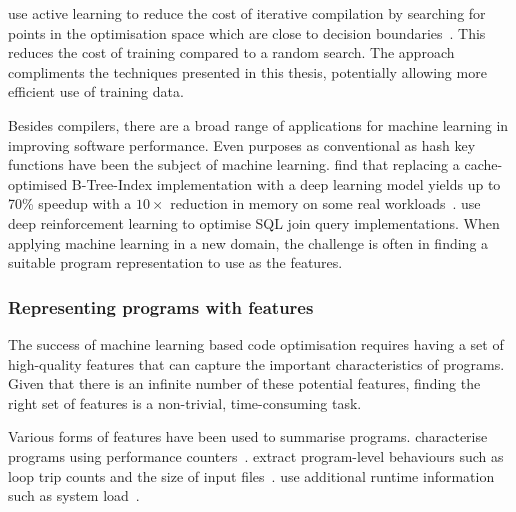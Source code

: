 \citeauthor{Ogilvie2017} use active learning to reduce the cost of iterative compilation by searching for points in the optimisation space which are close to decision boundaries~\cite{Ogilvie2017}. This reduces the cost of training compared to a random search. The approach compliments the techniques presented in this thesis, potentially allowing more efficient use of training data.

Besides compilers, there are a broad range of applications for machine learning in improving software performance.
Even purposes as conventional as hash key functions have been the subject of machine learning. \citeauthor{Kraska2017} find that replacing a cache-optimised B-Tree-Index implementation with a deep learning model yields up to 70\% speedup with a $10\times$ reduction in memory on some real workloads~\cite{Kraska2017}.
\citeauthor{Krishnan2018} use deep reinforcement learning to optimise SQL join query implementations. %
When applying machine learning in a new domain, the challenge is often in finding a suitable program representation to use as the features.


\subsubsection{Representing programs with features}

The success of machine learning based code optimisation requires having a set of high-quality features that can capture the important characteristics of programs. Given that there is an infinite number of these potential features, finding the right set of features is a non-trivial, time-consuming task.

Various forms of features have been used to summarise programs.
\citeauthor{Dubach2009} characterise programs using performance counters~\cite{Dubach2009}.
\citeauthor{Jiang2010} extract program-level behaviours such as loop trip counts and the size of input files~\cite{Jiang2010}.
\citeauthor{Berral2010a} use additional runtime information such as system load~\cite{Berral2010a}.


